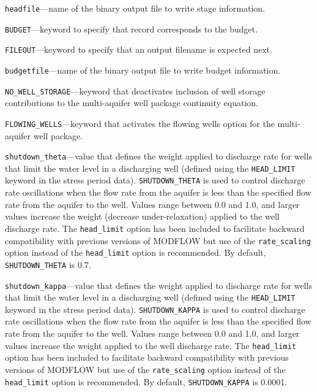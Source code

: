 \item \texttt{headfile}---name of the binary output file to write stage information.

\item \texttt{BUDGET}---keyword to specify that record corresponds to the budget.

\item \texttt{FILEOUT}---keyword to specify that an output filename is expected next.

\item \texttt{budgetfile}---name of the binary output file to write budget information.

\item \texttt{NO\_WELL\_STORAGE}---keyword that deactivates inclusion of well storage contributions to the multi-aquifer well package continuity equation.

\item \texttt{FLOWING\_WELLS}---keyword that activates the flowing wells option for the multi-aquifer well package.

\item \texttt{shutdown\_theta}---value that defines the weight applied to discharge rate for wells that limit the water level in a discharging well (defined using the \texttt{HEAD\_LIMIT} keyword in the stress period data). \texttt{SHUTDOWN\_THETA} is used to control discharge rate oscillations when the flow rate from the aquifer is less than the specified flow rate from the aquifer to the well. Values range between 0.0 and 1.0, and larger values increase the weight (decrease under-relaxation) applied to the well discharge rate. The \texttt{head\_limit} option has been included to facilitate backward compatibility with previous versions of MODFLOW but use of the \texttt{rate\_scaling} option instead of the \texttt{head\_limit} option is recommended. By default, \texttt{SHUTDOWN\_THETA} is 0.7.

\item \texttt{shutdown\_kappa}---value that defines the weight applied to discharge rate for wells that limit the water level in a discharging well (defined using the \texttt{HEAD\_LIMIT} keyword in the stress period data). \texttt{SHUTDOWN\_KAPPA} is used to control discharge rate oscillations when the flow rate from the aquifer is less than the specified flow rate from the aquifer to the well. Values range between 0.0 and 1.0, and larger values increase the weight applied to the well discharge rate. The \texttt{head\_limit} option has been included to facilitate backward compatibility with previous versions of MODFLOW but use of the \texttt{rate\_scaling} option instead of the \texttt{head\_limit} option is recommended. By default, \texttt{SHUTDOWN\_KAPPA} is 0.0001.

